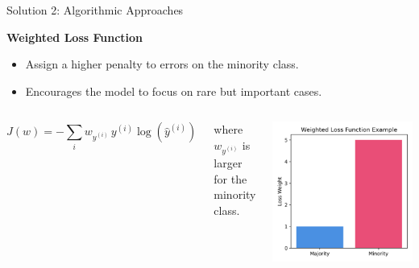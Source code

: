 \documentclass[serif, aspectratio=169]{beamer}
\begin{document}
\begin{frame}{Solution 2: Algorithmic Approaches}

\textbf{Weighted Loss Function}

\begin{itemize}\itemsep0.8em
    \item Assign a higher penalty to errors on the minority class.
    \item Encourages the model to focus on rare but important cases.
\end{itemize}

\vspace{0.5em}

\begin{columns}[c,onlytextwidth]
    \[
        J(w) = - \sum_{i} w_{y^{(i)}} \, y^{(i)} \log(\hat{y}^{(i)})
    \]
    \scriptsize
    \begin{center}
    where $w_{y^{(i)}}$ is larger for the minority class.
    \end{center}

    \centering
    \includegraphics[width=0.8\linewidth]{pic/Figure_36.png}\\
\end{columns}

\end{frame}
\end{document}
